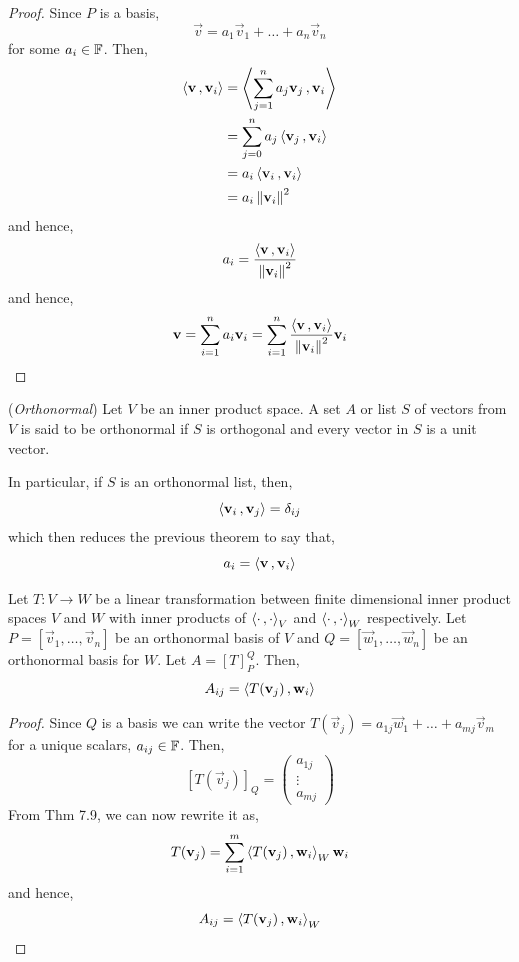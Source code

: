 \documentclass{article}
\begin{document}
\begin{proof}
  Since $P$ is a basis,
  $$ \vec v = a_1\vec v_1 + \dots + a_n\vec v_n $$
  for some $a_i\in \mathbb{F}$. Then,
  \begin{align*}
    \left\langle \boldsymbol{\mathbf{v}}\,, \boldsymbol{\mathbf{v}}_i \right\rangle &= \left\langle \sum_{j = 1}^n {a_j\boldsymbol{\mathbf{v}}_j}\,, \boldsymbol{\mathbf{v}}_i \right\rangle\\
    &= \sum_{j=0}^n a_j \left\langle \boldsymbol{\mathbf{v}}_j\,, \boldsymbol{\mathbf{v}}_i \right\rangle\\
    &= a_i \left\langle \boldsymbol{\mathbf{v}}_i\,, \boldsymbol{\mathbf{v}}_i \right\rangle\\
    &= a_i\left\lVert \boldsymbol{\mathbf{v}}_i\right\rVert^2
  \end{align*}
  and hence,
  $$ a_i = \frac{\left\langle \boldsymbol{\mathbf{v}}\,, \boldsymbol{\mathbf{v}}_i \right\rangle}{\left\lVert \boldsymbol{\mathbf{v}}_i\right\rVert^2} $$
  and hence,
  $$ \boldsymbol{\mathbf{v}} = \sum_{i = 1}^n {a_i \boldsymbol{\mathbf{v}}_i} = \sum_{i = 1}^n {\frac{\left\langle \boldsymbol{\mathbf{v}}\,, \boldsymbol{\mathbf{v}}_i \right\rangle}{\left\lVert \boldsymbol{\mathbf{v}}_i\right\rVert^2}}\boldsymbol{\mathbf{v}}_i $$
\end{proof}

\begin{ndefi}{(\textit{Orthonormal})}
  Let $V$ be an inner product space. A set $A$ or list $S$ of vectors from $V$ is said to be orthonormal if $S$ is orthogonal and every vector in $S$ is a unit vector.
\end{ndefi}

In particular, if $S$ is an orthonormal list, then,
$$ \left\langle \boldsymbol{\mathbf{v}}_i\,, \boldsymbol{\mathbf{v}}_j \right\rangle = \delta_{ij} $$
which then reduces the previous theorem to say that,
$$ a_i = \left\langle \boldsymbol{\mathbf{v}}\,, \boldsymbol{\mathbf{v}}_i \right\rangle $$

\begin{nthm}
  Let $T : V \to W$ be a linear transformation between finite dimensional inner product spaces $V$ and $W$ with inner products of $\left\langle \cdot\,, \cdot \right\rangle_V$ and $\left\langle \cdot\,, \cdot \right\rangle_W$ respectively. Let $P = [\vec v_1, \dots, \vec v_n]$ be an orthonormal basis of $V$ and $Q = [\vec w_1, \dots, \vec w_n]$ be an orthonormal basis for $W$. Let $A = [T]_P^Q$. Then,
  $$ A_{ij} = \left\langle T(\boldsymbol{\mathbf{v}}_j)\,, \boldsymbol{\mathbf{w}}_i \right\rangle $$
\end{nthm}

\begin{proof}
  Since $Q$ is a basis we can write the vector $T(\vec v_j) = a_{1j}\vec w_1 + \dots + a_{mj}\vec v_m$ for a unique scalars, $a_{ij}\in\mathbb{F}$. Then,
  $$ [T(\vec v_j)]_Q = \begin{pmatrix}
    a_{1j}\\
    \vdots\\
    a_{mj}
  \end{pmatrix} $$
  From Thm 7.9, we can now rewrite it as,
  $$ T(\boldsymbol{\mathbf{v}}_j) = \sum_{i=1}^m \left\langle T(\boldsymbol{\mathbf{v}}_j)\,, \boldsymbol{\mathbf{w}}_i \right\rangle_W \boldsymbol{\mathbf{w}}_i $$
  and hence,
  $$ A_{ij} = \left\langle T(\boldsymbol{\mathbf{v}}_j)\,, \boldsymbol{\mathbf{w}}_i \right\rangle_W $$
\end{proof}
\end{document}
